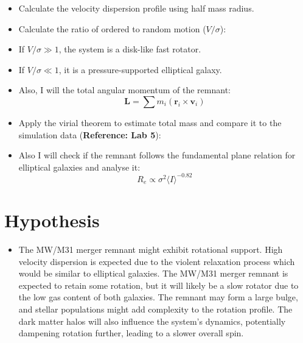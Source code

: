 \documentclass{article}
\begin{document}
\begin{itemize}
    \item Calculate the velocity dispersion profile using half mass radius.
    
    \item Calculate the ratio of ordered to random motion ($V/\sigma$):
    \item If $V/\sigma \gg 1$, the system is a disk-like fast rotator.
    \item If $V/\sigma \ll 1$, it is a pressure-supported elliptical galaxy.
    
    \item Also, I will the total angular momentum of the remnant:
    \begin{equation}
        \mathbf{L} = \sum m_i (\mathbf{r}_i \times \mathbf{v}_i)
    \end{equation}
\end{itemize}

\begin{itemize}
    \item Apply the virial theorem to estimate total mass and compare it to the simulation data (\textbf{Reference: Lab 5}):
   
    \item Also I will check if the remnant follows the fundamental plane relation for elliptical galaxies and analyse it:
    \begin{equation}
        R_e \propto \sigma^2 \langle I \rangle^{-0.82}
    \end{equation}

\end{itemize}

\section{Hypothesis}

\begin{itemize}
    \item The MW/M31 merger remnant might exhibit  rotational support.  High velocity dispersion is expected due to the violent relaxation process which would be similar to  elliptical galaxies.  
    The MW/M31 merger remnant is expected to retain some rotation, but it will likely be a slow rotator due to the low gas content of both galaxies. The remnant may form a large bulge, and stellar populations might add complexity to the rotation profile. The dark matter halos will also influence the system's dynamics, potentially dampening rotation further, leading to a slower overall spin.
\end{itemize}


\printbibliography
\end{document}
